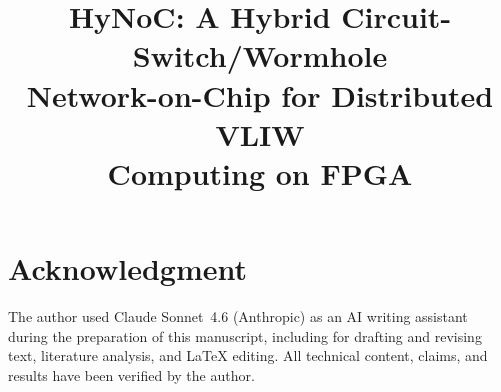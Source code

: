 \documentclass[conference]{IEEEtran}
\begin{document}
\title{HyNoC: A Hybrid Circuit-Switch/Wormhole\\
Network-on-Chip for Distributed VLIW\\
Computing on FPGA}

\author{
}

\maketitle











\section*{Acknowledgment}
The author used Claude Sonnet~4.6 (Anthropic) as an AI writing assistant during
the preparation of this manuscript, including for drafting and revising text,
literature analysis, and \LaTeX{} editing. All technical content, claims, and
results have been verified by the author.



\end{document}

